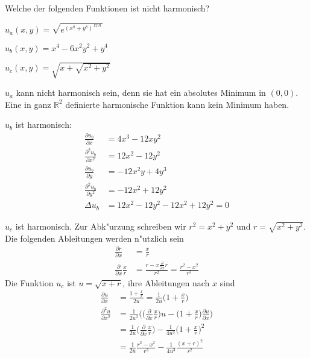 Welche der folgenden Funktionen ist nicht harmonisch?
\begin{teilaufgaben}
\item $u_a(x,y)=\sqrt{e^{(x^8+y^8)^{1291}}}$
\item $u_b(x,y)=x^4-6x^2y^2+y^4$
\item $u_c(x,y)=\sqrt{x+\sqrt{x^2+y^2}}$
\end{teilaufgaben}

\begin{loesung}
\begin{teilaufgaben}
\item $u_a$ kann nicht harmonisch sein, denn sie hat
ein absolutes Minimum in $(0,0)$. Eine in ganz $\mathbb R^2$ definierte
harmonische Funktion kann kein Minimum haben.
\item $u_b$ ist harmonisch:
\begin{align*}
\frac{\partial u_b}{\partial x}
&= 4x^3-12xy^2\\
\frac{\partial^2 u_b}{\partial x^2}
&= 12x^2-12y^2\\
\frac{\partial u_b}{\partial y}
&= -12x^2y+4y^3\\
\frac{\partial^2 u_b}{\partial y^2}
&= -12x^2+12y^2
\\
\Delta u_b&=
 12x^2-12y^2
 -12x^2+12y^2
=0
\end{align*}
\item $u_c$ ist harmonisch. Zur Abk"urzung schreiben wir
$r^2=x^2+y^2$ und $r=\sqrt{x^2 + y^2}$. Die folgenden
Ableitungen werden n"utzlich sein
\begin{align*}
\frac{\partial r}{\partial x}&=\frac{x}{r}
\\
\frac{\partial }{\partial x}\frac{x}{r}
&=
\frac{r-x\frac{\partial}{\partial x}r}{r^2}
=\frac{r^2-x^2}{r^3}
\end{align*}
Die Funktion $u_c$ ist $u=\sqrt{x+r}$, ihre Ableitungen nach $x$ sind
\begin{align*}
\frac{\partial u}{\partial x}
&=
\frac{1+\frac{x}r}{2u}
=\frac1{2u}\biggl(1+\frac{x}r\biggr)
\\
\frac{\partial^2u}{\partial x^2}
&=
\frac1{2u^2}\biggl(
\biggl(
\frac{\partial }{\partial x}\frac{x}r
\biggr)u
-\biggl(1+\frac{x}{r}\biggr)\frac{\partial u}{\partial x}\biggr)
\\
&=
\frac1{2u}
\biggl(
\frac{\partial }{\partial x}\frac{x}r
\biggr)
-
\frac1{4u^3}
\biggl(1+\frac{x}{r}\biggr)^2
\\
&=
\frac1{2u}\frac{r^2-x^2}{r^3}
-
\frac1{4u^3}
\frac{(x+r)^2}{r^2}
\end{align*}

\end{teilaufgaben}
\end{loesung}
